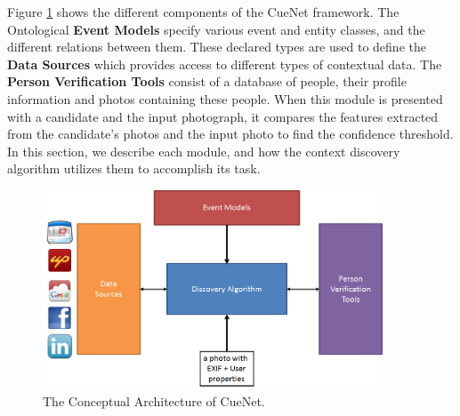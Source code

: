 Figure \ref{fig:cuenet-arch} shows the different components of the CueNet framework. The Ontological \textbf{Event Models} specify various event and entity classes, and the different relations between them. These declared types are used to define the \textbf{Data Sources} which provides access to different types of contextual data. The \textbf{Person Verification Tools} consist of a database of people, their profile information and photos containing these people. When this module is presented with a candidate and the input photograph, it compares the features extracted from the candidate's photos and the input photo to find the confidence threshold. In this section, we describe each module, and how the context discovery algorithm utilizes them to accomplish its task.

\begin{figure}[t]
\centering
\includegraphics[width=0.9\textwidth]{media/cuenet-high-level-arch.png}
\caption{The Conceptual Architecture of CueNet.}
\label{fig:cuenet-arch}
\end{figure}


